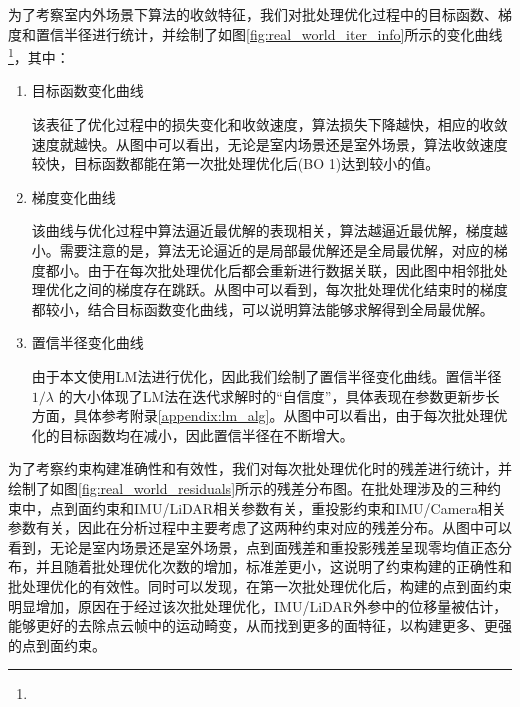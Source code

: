 为了考察室内外场景下算法的收敛特征，我们对批处理优化过程中的目标函数、梯度和置信半径进行统计，并绘制了如图\ref{fig:real_world_iter_info}所示的变化曲线\footnote{}，其中：
\begin{enumerate}
  \item 目标函数变化曲线

        该表征了优化过程中的损失变化和收敛速度，算法损失下降越快，相应的收敛速度就越快。从图中可以看出，无论是室内场景还是室外场景，算法收敛速度较快，目标函数都能在第一次批处理优化后(BO 1)达到较小的值。

  \item 梯度变化曲线

        该曲线与优化过程中算法逼近最优解的表现相关，算法越逼近最优解，梯度越小。需要注意的是，算法无论逼近的是局部最优解还是全局最优解，对应的梯度都小。由于在每次批处理优化后都会重新进行数据关联，因此图中相邻批处理优化之间的梯度存在跳跃。从图中可以看到，每次批处理优化结束时的梯度都较小，结合目标函数变化曲线，可以说明算法能够求解得到全局最优解。

  \item 置信半径变化曲线

        由于本文使用LM法进行优化，因此我们绘制了置信半径变化曲线。置信半径$1/\lambda$
        的大小体现了LM法在迭代求解时的“自信度”，具体表现在参数更新步长方面，具体参考附录\ref{appendix:lm_alg}。从图中可以看出，由于每次批处理优化的目标函数均在减小，因此置信半径在不断增大。
\end{enumerate}

为了考察约束构建准确性和有效性，我们对每次批处理优化时的残差进行统计，并绘制了如图\ref{fig:real_world_residuals}所示的残差分布图。在批处理涉及的三种约束中，点到面约束和IMU/LiDAR相关参数有关，重投影约束和IMU/Camera相关参数有关，因此在分析过程中主要考虑了这两种约束对应的残差分布。从图中可以看到，无论是室内场景还是室外场景，点到面残差和重投影残差呈现零均值正态分布，并且随着批处理优化次数的增加，标准差更小，这说明了约束构建的正确性和批处理优化的有效性。同时可以发现，在第一次批处理优化后，构建的点到面约束明显增加，原因在于经过该次批处理优化，IMU/LiDAR外参中的位移量被估计，能够更好的去除点云帧中的运动畸变，从而找到更多的面特征，以构建更多、更强的点到面约束。

